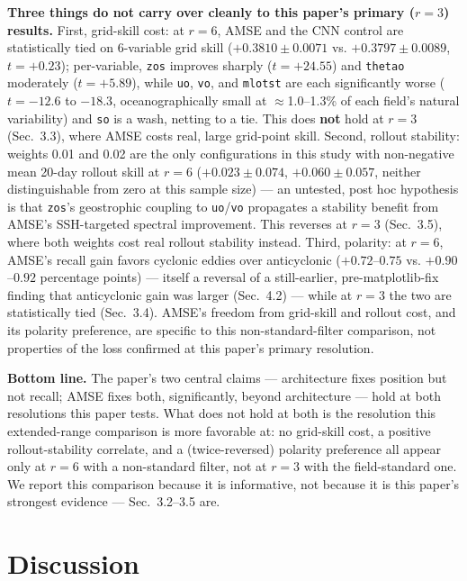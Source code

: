 \documentclass[11pt]{article}
\begin{document}
\textbf{Three things do not carry over cleanly to this paper's primary ($r=3$) results.} First, grid-skill cost: at $r=6$, AMSE and the CNN control are statistically tied on 6-variable grid skill ($+0.3810 \pm 0.0071$ vs. $+0.3797 \pm 0.0089$, $t=+0.23$); per-variable, \texttt{zos} improves sharply ($t=+24.55$) and \texttt{thetao} moderately ($t=+5.89$), while \texttt{uo}, \texttt{vo}, and \texttt{mlotst} are each significantly worse ($t=-12.6$ to $-18.3$, oceanographically small at $\approx$1.0--1.3\% of each field's natural variability) and \texttt{so} is a wash, netting to a tie. This does \textbf{not} hold at $r=3$ (Sec.~3.3), where AMSE costs real, large grid-point skill. Second, rollout stability: weights 0.01 and 0.02 are the only configurations in this study with non-negative mean 20-day rollout skill at $r=6$ ($+0.023 \pm 0.074$, $+0.060 \pm 0.057$, neither distinguishable from zero at this sample size) --- an untested, post hoc hypothesis is that \texttt{zos}'s geostrophic coupling to \texttt{uo}/\texttt{vo} propagates a stability benefit from AMSE's SSH-targeted spectral improvement. This reverses at $r=3$ (Sec.~3.5), where both weights cost real rollout stability instead. Third, polarity: at $r=6$, AMSE's recall gain favors cyclonic eddies over anticyclonic ($+0.72$--$0.75$ vs. $+0.90$--$0.92$ percentage points) --- itself a reversal of a still-earlier, pre-matplotlib-fix finding that anticyclonic gain was larger (Sec.~4.2) --- while at $r=3$ the two are statistically tied (Sec.~3.4). AMSE's freedom from grid-skill and rollout cost, and its polarity preference, are specific to this non-standard-filter comparison, not properties of the loss confirmed at this paper's primary resolution.

\textbf{Bottom line.} The paper's two central claims --- architecture fixes position but not recall; AMSE fixes both, significantly, beyond architecture --- hold at both resolutions this paper tests. What does not hold at both is the resolution this extended-range comparison is more favorable at: no grid-skill cost, a positive rollout-stability correlate, and a (twice-reversed) polarity preference all appear only at $r=6$ with a non-standard filter, not at $r=3$ with the field-standard one. We report this comparison because it is informative, not because it is this paper's strongest evidence --- Sec.~3.2--3.5 are.

\section{Discussion}
\end{document}
